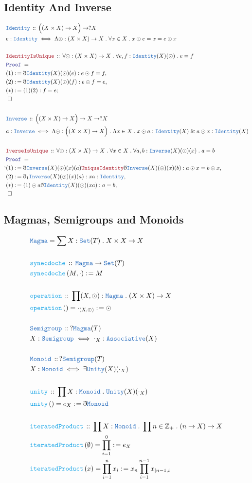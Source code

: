 \documentclass[12pt]{scrartcl}
\newcommand{\TYPE}[1]{\textcolor{NavyBlue}{\mathtt{#1}}}
\newcommand{\FUNC}[1]{\textcolor{Cerulean}{\mathtt{#1}}}
\newcommand{\LOGIC}[1]{\textcolor{Blue}{\mathtt{#1}}}
\newcommand{\THM}[1]{\textcolor{Maroon}{\mathtt{#1}}}
\renewcommand{\.}{\; . \;}
\newcommand{\de}{: \kern 0.1pc =}
\newcommand{\Act}[1]{\left( #1 \right)}
\newcommand{\Theorem}[2]{& \THM{#1} \, :: \, #2 \\ & \Proof = \\ }
\newcommand{\DeclareType}[2]{& \TYPE{#1} \, :: \, #2 \\}
\newcommand{\DefineType}[3]{& #1 : \TYPE{#2} \iff #3 \\}
\newcommand{\DeclareFunc}[2]{& \FUNC{#1} \, :: \, #2 \\}
\newcommand{\DefineFunc}[3]{&  \FUNC{#1}\Act{#2} \de #3 \\}
\newcommand{\DefineNamedFunc}[4]{&  \FUNC{#1}\Act{#2} = #3 \de #4 \\}
\newcommand{\Page}[1]{ \begin{align*} #1 \end{align*}   }
\newcommand{ \bd }{ \ByDef }
\renewcommand{\And}{\; \& \;}
\newcommand{\NNInt}{\mathbb{Z}_{+} }
\newcommand{\Say}[3]{& #1 \de #2 : #3, \\}
\newcommand{\Conclude}[3]{& #1 \de #2 : #3; \\}
\newcommand{\QED}{\; \square}
\newcommand{\EndProof}{& \QED \\}
\newcommand{\ByDef}{\eth}
\newcommand{\Proof}{\LOGIC{Proof} \; }
\begin{document}
\subsection{Identity And Inverse}
\Page{
	\DeclareType{Identity}{ \Big((X \times X) \to X\Big) \to ?X  }
	\DefineType{e}{Identity}{ \Lambda \odot : (X \times X) \to X \. 
		\forall x \in X \. x \odot e = x = e \odot x    }
	\\
	\Theorem{IdentityIsUnique}{ \forall \odot : (X \times X) \to X \. \forall e, f : \TYPE{Identity}(X)(\odot) 
		\. e = f
	}
	\Say{(1)}{ \bd \TYPE{Identity}(X)(\odot)(e)}{ e \odot f = f }
	\Say{(2)}{\bd \TYPE{Identity}(X)(\odot)(f)}{e \odot f = e }
	\Conclude{(*)}{(1)(2)}{f = e}
	\EndProof
	\\
	\DeclareType{Inverse}{ \Big( (X \times X) \to X \Big) \to X \to ?X }
	\DefineType{a}{Inverse}{ \Lambda \odot :\Big((X \times X) \to X \Big) 
		\. \Lambda x \in X \.  x \odot a : \TYPE{Identity}(X) \And a \odot x : \TYPE{Identity}(X)   }
	\\
	\Theorem{IverseIsUnique}{\forall \odot : (X \times X) \to X \. \forall x \in X \. 
		\forall a, b : \TYPE{Inverse}(X)(\odot)(x) \. a = b}`
	\Say{(1)}{\bd \TYPE{Inverse}(X)(\odot)(x)(a) \THM{UniqueIdentity} \bd \TYPE{Inverse}(X)(\odot)(x)(b) }
	{ a \odot x = b \odot x  }
	\Say{(2)}{ \bd_1 \TYPE{Inverse}(X)(\odot)(x)(a) }{  xa : \TYPE{Identity}  }
	\Say{(*)}{ (1) \odot a \bd \TYPE{Identity}(X)(\odot)(xa)  }{a = b}
	\EndProof
}
\newpage
\subsection{Magmas, Semigroups and Monoids}
\Page{
	& \TYPE{Magma} = \sum X : \TYPE{Set}(T) \. X \times X \to X \\ 
	\\
	\DeclareFunc{synecdoche}{ \TYPE{Magma} \to \TYPE{Set}(T) }
	\DefineFunc{synecdoche}{M,\cdot}{M}
	\\
	\DeclareFunc{operation}{ \prod (X, \odot) : \TYPE{Magma} \. (X \times X) \to X }
	\DefineNamedFunc{operation}{   }{\cdot_{(X,\odot)}}{\odot}
	\\
	\DeclareType{Semigroup}{?\TYPE{Magma}(T)} 
	\DefineType{X}{Semigroup}{ \cdot_X : \TYPE{Associative}(X) }
	\\
	\DeclareType{Monoid}{?\TYPE{Semigroup}(T)}
	\DefineType{X}{Monoid}{\exists \TYPE{Unity}(X)(\cdot_X)}
	\\
	\DeclareFunc{unity}{\prod X : \TYPE{Monoid} \. \TYPE{Unity}(X)(\cdot_X)}
	\DefineNamedFunc{unity}{}{e_X}{ \bd \TYPE{Monoid}}
	\\
	\DeclareFunc{iteratedProduct}{ \prod X : \TYPE{Monoid} \. \prod n \in \NNInt \. (n \to X) \to X}
	\DefineNamedFunc{iteratedProduct}{\emptyset}{\prod^0_{i = 1}}{e_X}
	\DefineNamedFunc{iteratedProduct}{ x }{ \prod^n_{i = 1} x_i }{  x_n\prod^{n-1}_{i = 1} x_{|n-1 ,i}  }
}
\end{document}
